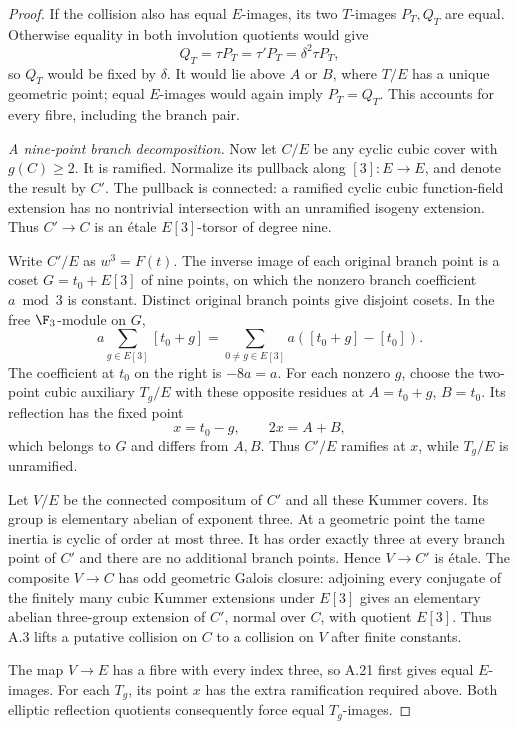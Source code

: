 \begin{proof}
If the collision also has equal $E$-images, its two
$T$-images $P_T,Q_T$ are equal. Otherwise equality in
both involution quotients would give
\[
 Q_T=\tau P_T=\tau'P_T=\delta^2\tau P_T,
\]
so $Q_T$ would be fixed by $\delta$. It would lie above
$A$ or $B$, where $T/E$ has a unique geometric point;
equal $E$-images would again imply $P_T=Q_T$.
This accounts for every fibre, including the branch pair.

\emph{A nine-point branch decomposition.}
Now let $C/E$ be any cyclic cubic cover with $g(C)\ge2$.
It is ramified. Normalize its pullback along $[3]:E\to E$,
and denote the result by $C'$. The pullback is connected:
a ramified cyclic cubic function-field extension has no
nontrivial intersection with an unramified isogeny
extension. Thus $C'\to C$ is an \'{e}tale $E[3]$-torsor
of degree nine.

Write $C'/E$ as $w^3=F(t)$. The inverse image of each
original branch point is a coset $G=t_0+E[3]$ of nine
points, on which the nonzero branch coefficient
$a\bmod3$ is constant. Distinct original branch points
give disjoint cosets. In the free $\F_3$-module on $G$,
\[
 a\sum_{g\in E[3]}[t_0+g]
   =\sum_{0\ne g\in E[3]}a([t_0+g]-[t_0]).               \tag{A.46}
\]
The coefficient at $t_0$ on the right is $-8a=a$.
For each nonzero $g$, choose the two-point cubic auxiliary
$T_g/E$ with these opposite residues at
$A=t_0+g$, $B=t_0$. Its reflection has the fixed point
\[
 x=t_0-g,\qquad 2x=A+B,
\]
which belongs to $G$ and differs from $A,B$.
Thus $C'/E$ ramifies at $x$, while $T_g/E$ is unramified.

Let $V/E$ be the connected compositum of $C'$ and all
these Kummer covers. Its group is elementary abelian
of exponent three. At a geometric point the tame inertia
is cyclic of order at most three. It has order exactly
three at every branch point of $C'$ and there are no
additional branch points. Hence $V\to C'$ is \'{e}tale.
The composite $V\to C$ has odd geometric Galois closure:
adjoining every conjugate of the finitely many cubic
Kummer extensions under $E[3]$ gives an elementary abelian
three-group extension of $C'$, normal over $C$, with
quotient $E[3]$. Thus A.3 lifts a putative collision on
$C$ to a collision on $V$ after finite constants.

The map $V\to E$ has a fibre with every index three, so
A.21 first gives equal $E$-images. For each $T_g$, its
point $x$ has the extra ramification required above.
Both elliptic reflection quotients consequently force
equal $T_g$-images.


\end{proof}
